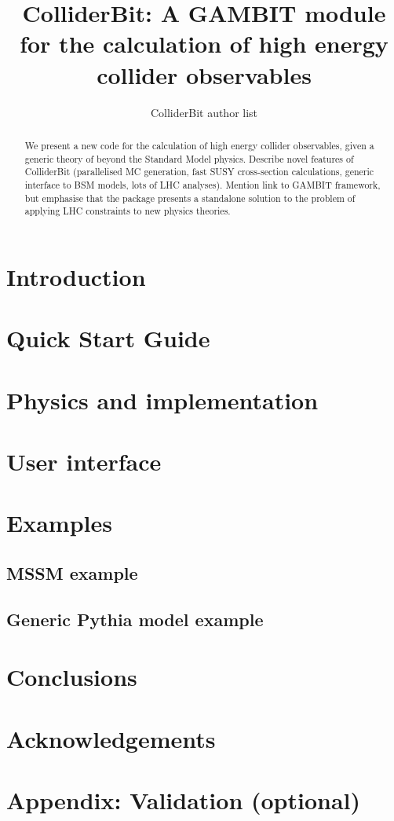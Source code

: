 \documentclass[11pt,a4paper]{article}
\title{ColliderBit: A GAMBIT module for the calculation of high energy collider observables}
\author{ColliderBit author list} %
\begin{document}
\maketitle

\begin{abstract}
We present a new code for the calculation of high energy collider observables, given a generic theory of beyond the Standard Model physics. Describe novel features of ColliderBit (parallelised MC generation, fast SUSY cross-section calculations, generic interface to BSM models, lots of LHC analyses). Mention link to GAMBIT framework, but emphasise that the package presents a standalone solution to the problem of applying LHC constraints to new physics theories.
\end{abstract}

\section{Introduction}


\section{Quick Start Guide}
\label{sec:quickstart}


\section{Physics and implementation}
\label{sec:code}


\section{User interface}
\label{sec:interface}


\section{Examples}
\label{sec:examples}


\subsection{MSSM example}


\subsection{Generic Pythia model example}


\section{Conclusions}

\section{Acknowledgements}

\section{Appendix: Validation (optional)}



\end{document}
